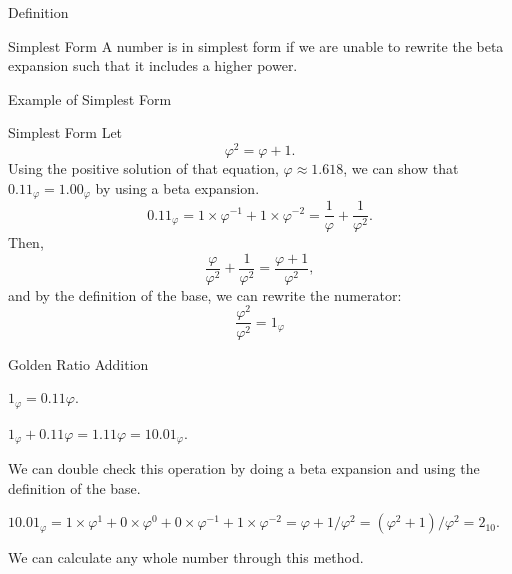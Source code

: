 \documentclass{beamer}
\begin{document}
\begin{frame}{Definition}
  \begin{block}{Simplest Form}
    A number is in simplest form if we are unable to rewrite the beta expansion such that it includes a higher power.
  \end{block}
\end{frame}

\begin{frame}{Example of Simplest Form}
  \begin{block}{Simplest Form}
    Let $$\varphi^2 = \varphi + 1.$$ \pause
    Using the positive solution of that equation, $\varphi \approx 1.618$, we can show that $0.11_\varphi = 1.00_\varphi$ by using a beta expansion. \pause
    $$0.11_\varphi = 1\times\varphi^{-1} + 1\times\varphi^{-2} = \frac{1}{\varphi} + \frac{1}{\varphi^2}.$$ \pause
    Then,
    $$\frac{\varphi}{\varphi^2} + \frac{1}{\varphi^2} = \frac{\varphi+1}{\varphi^2},$$\pause
    and by the definition of the base, we can rewrite the numerator:
    $$\frac{\varphi^2}{\varphi^2} = 1_\varphi$$
  \end{block}
\end{frame}


\begin{frame}{Golden Ratio Addition}
  \begin{example}\pause
    $1_\varphi = 0.11\varphi.$\pause

    $1_\varphi + 0.11\varphi = 1.11\varphi = 10.01_\varphi.$\pause

    We can double check this operation by doing a beta expansion and using the definition of the base.\pause

    $10.01_\varphi = 1\times\varphi^1+0\times\varphi^0+0\times\varphi^{-1}+1\times\varphi^{-2}=\varphi + 1/\varphi^2 = (\varphi^2 + 1)/\varphi^2 = 2_{10}.$ \pause

    We can calculate any whole number through this method.
  \end{example}
\end{frame}










\end{document}
